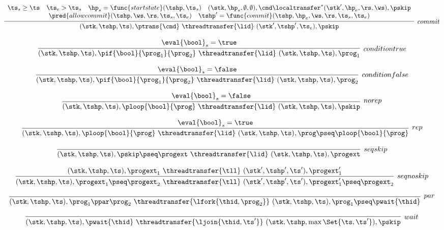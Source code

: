 \[
    \infer[commit]{%
        ( \stk, \tshp, \ts ) , \ptrans{\cmd} \ \threadtransfer{\lid} \ ( \stk', \tshp', \ts_{e} ) , \pskip
    }{%
        \begin{array}{c}
            \ts_{s} \geq \ts
            \quad \ts_{e} > \ts_{s} 
            \quad \hp_{s} = \func{startstate}(\tshp, \ts_{s}) 
            \quad ( \stk, \hp_{s}, \emptyset, \emptyset ) , \cmd \localtransfer^{*} ( \stk', \hp_{e}, \rs, \ws ) , \pskip \\
            \pred{allowcommit}(\tshp,\ws,\rs,\ts_{s},\ts_{e}) 
            \quad \tshp' = \func{commit}(\tshp,\hp_{e},\ws,\rs,\ts_{s},\ts_{e})
        \end{array}
    }
\]

\[
    \infer[conditiontrue]{%
        ( \stk, \tshp, \ts ) , \pif{\bool}{\prog_{1}}{\prog_{2}} \ \threadtransfer{\lid} \  ( \stk, \tshp, \ts ) , \prog_{1}
    }{%
        \eval{\bool}_{s} = \true
    }
\]

\[
    \infer[conditionfalse]{%
        ( \stk, \tshp, \ts ) , \pif{\bool}{\prog_{1}}{\prog_{2}} \ \threadtransfer{\lid} \  ( \stk, \tshp, \ts ) , \prog_{2}
    }{%
        \eval{\bool}_{s} = \false
    }
\]

\[
    \infer[norep]{%
        ( \stk, \tshp, \ts ) , \ploop{\bool}{\prog} \ \threadtransfer{\lid} \ ( \stk, \tshp, \ts ) , \pskip
    }{%
        \eval{\bool}_{s} = \false
    }
\]

\[
    \infer[rep]{%
        ( \stk, \tshp, \ts ) , \ploop{\bool}{\prog} \ \threadtransfer{\lid} \  ( \stk, \tshp, \ts ) , \prog \pseq \ploop{\bool}{\prog}
    }{%
        \eval{\bool}_{s} = \true
    }
\]

\[
    \infer[seqskip]{%
        ( \stk, \tshp, \ts ) , \pskip \pseq \progext \ \threadtransfer{\lid} \  ( \stk, \tshp, \ts ) , \progext
    }{%
    }
\]

\[
    \infer[seqnoskip]{%
        ( \stk, \tshp, \ts ) , \progext_{1} \pseq \progext_{2} \ \threadtransfer{\tll} \ ( \stk', \tshp', \ts' ) , \progext_{1}' \pseq \progext_{2}
    }{%
        ( \stk, \tshp, \ts ) , \progext_{1} \ \threadtransfer{\tll} \  ( \stk', \tshp', \ts' ) , \progext_{1}' 
    }
\]

\[
    \infer[par]{%
        ( \stk, \tshp, \ts ) , \prog_{1} \ppar \prog_{2} \ \threadtransfer{\lfork{\thid, \prog_{2}}} \  ( \stk, \tshp, \ts ) , \prog_{1} \pseq \pwait{\thid}
    }{%
    }
\]

\[
    \infer[wait]{%
        ( \stk, \tshp, \ts ) , \pwait{\thid} \ \threadtransfer{\ljoin{\thid,\ts'}} \  ( \stk, \tshp , \max\Set{\ts,\ts'} ) , \pskip 
    }{%
    }
\]

